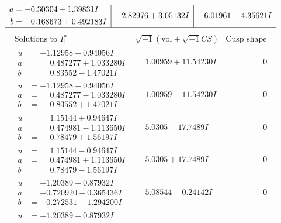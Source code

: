 \documentclass[1p]{elsarticle_modified}
\theoremstyle{definition}
\newcommand{\I}{\sqrt{-1}}
\begin{document}
$$\begin{array}{c|c|c}
\begin{aligned}
a &= -0.30304 + 1.39831 I \\
b &= -0.168673 + 0.492183 I\end{aligned}
 & \phantom{-}2.82976 + 3.05132 I & -6.01961 - 4.35621 I\\
 \hline 
 \end{array}$$\newpage$$\begin{array}{c|c|c}  
\text{Solutions to }I^u_{1}& \I (\text{vol} + \sqrt{-1}CS) & \text{Cusp shape}\\
 \hline 
\begin{aligned}
u &= -1.12958 + 0.94056 I \\
a &= \phantom{-}0.487277 + 1.033280 I \\
b &= \phantom{-}0.83552 - 1.47021 I\end{aligned}
 & \phantom{-}1.00959 + 11.54230 I & \phantom{-0.000000 } 0 \\ \hline\begin{aligned}
u &= -1.12958 - 0.94056 I \\
a &= \phantom{-}0.487277 - 1.033280 I \\
b &= \phantom{-}0.83552 + 1.47021 I\end{aligned}
 & \phantom{-}1.00959 - 11.54230 I & \phantom{-0.000000 } 0 \\ \hline\begin{aligned}
u &= \phantom{-}1.15144 + 0.94647 I \\
a &= \phantom{-}0.474981 - 1.113650 I \\
b &= \phantom{-}0.78479 + 1.56197 I\end{aligned}
 & \phantom{-}5.0305 - 17.7489 I & \phantom{-0.000000 } 0 \\ \hline\begin{aligned}
u &= \phantom{-}1.15144 - 0.94647 I \\
a &= \phantom{-}0.474981 + 1.113650 I \\
b &= \phantom{-}0.78479 - 1.56197 I\end{aligned}
 & \phantom{-}5.0305 + 17.7489 I & \phantom{-0.000000 } 0 \\ \hline\begin{aligned}
u &= -1.20389 + 0.87932 I \\
a &= -0.720920 - 0.365436 I \\
b &= -0.272531 + 1.294200 I\end{aligned}
 & \phantom{-}5.08544 - 0.24142 I & \phantom{-0.000000 } 0 \\ \hline\begin{aligned}
u &= -1.20389 - 0.87932 I \\

\end{aligned}
\end{array}$$
\end{document}
